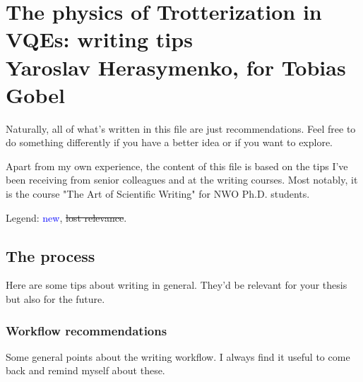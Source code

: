 \documentclass[10pt, a4paper]{article}
\def\blue{\textcolor{blue}}
\begin{document}
\section*{The physics of Trotterization in VQEs: writing tips\\
\small{Yaroslav Herasymenko, for Tobias Gobel}}


Naturally, all of what's written in this file are just recommendations. Feel free to do something differently if you have a better idea or if you want to explore. 

Apart from my own experience, the content of this file is based on the tips I've been receiving from senior colleagues and at the writing courses. Most notably, it is the course "The Art of Scientific Writing" for NWO Ph.D. students.

Legend: \blue{new}, \st{lost relevance}.

\subsection*{The process}

Here are some tips about writing in general. They'd be relevant for your thesis but also for the future.


\subsubsection*{Workflow recommendations}

Some general points about the writing workflow. I always find it useful to come back and remind myself about these.
\end{document}
